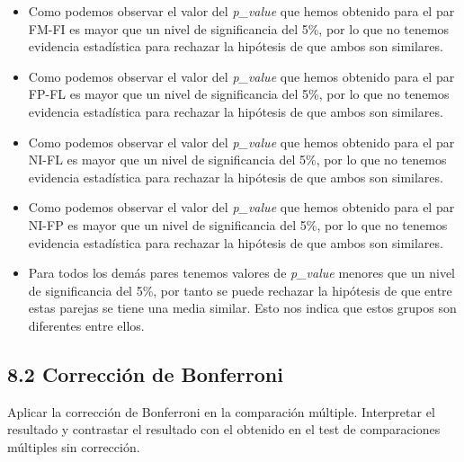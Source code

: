 \documentclass[
]{article}
\newenvironment{Shaded}{\begin{snugshade}}{\end{snugshade}}
\newcommand{\AttributeTok}[1]{\textcolor[rgb]{0.77,0.63,0.00}{#1}}
\newcommand{\FunctionTok}[1]{\textcolor[rgb]{0.00,0.00,0.00}{#1}}
\newcommand{\NormalTok}[1]{#1}
\newcommand{\SpecialCharTok}[1]{\textcolor[rgb]{0.00,0.00,0.00}{#1}}
\newcommand{\StringTok}[1]{\textcolor[rgb]{0.31,0.60,0.02}{#1}}
\begin{document}
\begin{itemize}
\item
  Como podemos observar el valor del \emph{p\_value} que hemos obtenido
  para el par FM-FI es mayor que un nivel de significancia del 5\%, por
  lo que no tenemos evidencia estadística para rechazar la hipótesis de
  que ambos son similares.
\item
  Como podemos observar el valor del \emph{p\_value} que hemos obtenido
  para el par FP-FL es mayor que un nivel de significancia del 5\%, por
  lo que no tenemos evidencia estadística para rechazar la hipótesis de
  que ambos son similares.
\item
  Como podemos observar el valor del \emph{p\_value} que hemos obtenido
  para el par NI-FL es mayor que un nivel de significancia del 5\%, por
  lo que no tenemos evidencia estadística para rechazar la hipótesis de
  que ambos son similares.
\item
  Como podemos observar el valor del \emph{p\_value} que hemos obtenido
  para el par NI-FP es mayor que un nivel de significancia del 5\%, por
  lo que no tenemos evidencia estadística para rechazar la hipótesis de
  que ambos son similares.
\item
  Para todos los demás pares tenemos valores de \emph{p\_value} menores
  que un nivel de significancia del 5\%, por tanto se puede rechazar la
  hipótesis de que entre estas parejas se tiene una media similar. Esto
  nos indica que estos grupos son diferentes entre ellos.
\end{itemize}

\newpage

\hypertarget{correcciuxf3n-de-bonferroni}{%
\subsection{8.2 Corrección de
Bonferroni}\label{correcciuxf3n-de-bonferroni}}

Aplicar la corrección de Bonferroni en la comparación múltiple.
Interpretar el resultado y contrastar el resultado con el obtenido en el
test de comparaciones múltiples sin corrección.

\vspace{0.3cm}

\begin{Shaded}
\end{Shaded}
\end{document}
